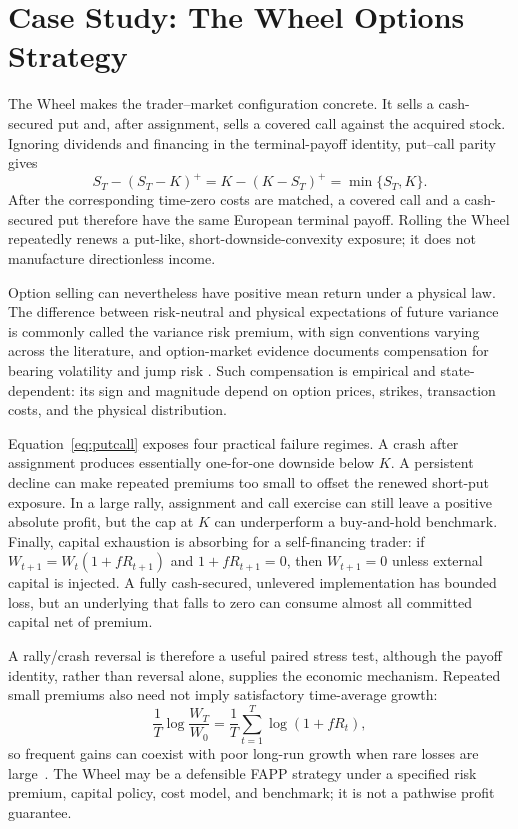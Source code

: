 \documentclass[aps,pra,reprint,superscriptaddress,amsmath,amssymb,floatfix]{revtex4-2}
\theoremstyle{plain}
\theoremstyle{definition}
\theoremstyle{remark}
\begin{document}
\section{Case Study: The Wheel Options Strategy}
\label{sec:wheel}

The Wheel makes the trader--market configuration concrete. It sells a
cash-secured put and, after assignment, sells a covered call against the
acquired stock. Ignoring dividends and financing in the terminal-payoff
identity, put--call parity gives
\begin{equation}
  S_T-(S_T-K)^+
  =K-(K-S_T)^+
  =\min\{S_T,K\}.
  \label{eq:putcall}
\end{equation}
After the corresponding time-zero costs are matched, a covered call and a
cash-secured put therefore have the same European terminal payoff. Rolling the
Wheel repeatedly renews a put-like, short-downside-convexity exposure; it does
not manufacture directionless income.

Option selling can nevertheless have positive mean return under a physical
law. The
difference between risk-neutral and physical expectations of future variance
is commonly called the variance risk premium, with sign conventions varying
across the literature, and option-market evidence documents compensation for
bearing volatility and jump risk
\cite{BakshiKapadia2003,CarrWu2009}. Such compensation is empirical and
state-dependent: its sign and magnitude depend on option prices, strikes,
transaction costs, and the physical distribution.

Equation~\eqref{eq:putcall} exposes four practical failure regimes. A crash
after assignment produces essentially one-for-one downside below \(K\). A
persistent decline can make repeated premiums too small to offset the renewed
short-put exposure. In a large rally, assignment and call exercise can still
leave a positive absolute profit, but the cap at \(K\) can underperform a
buy-and-hold benchmark. Finally, capital exhaustion is absorbing for a
self-financing trader: if \(W_{t+1}=W_t(1+fR_{t+1})\) and
\(1+fR_{t+1}=0\), then \(W_{t+1}=0\) unless external capital is injected. A
fully cash-secured, unlevered implementation has bounded loss, but an
underlying that falls to zero can consume almost all committed capital net of
premium.

A rally/crash reversal is therefore a useful paired stress test, although the
payoff identity, rather than reversal alone, supplies the economic mechanism.
Repeated small premiums also need not imply satisfactory time-average growth:
\[
  \frac1T\log\frac{W_T}{W_0}
  =\frac1T\sum_{t=1}^T\log(1+fR_t),
\]
so frequent gains can coexist with poor long-run growth when rare losses are
large~\cite{Peters2019}. The Wheel may be a defensible FAPP strategy under a
specified risk premium, capital policy, cost model, and benchmark; it is not a
pathwise profit guarantee.
\end{document}
